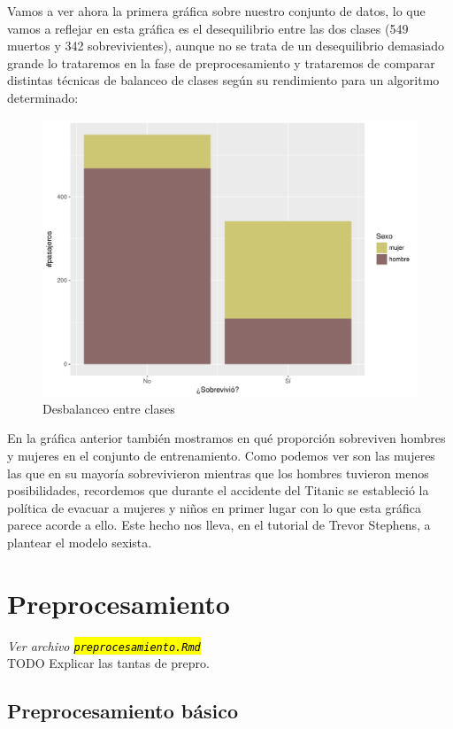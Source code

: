 \documentclass[10pt,a4paper]{article}
\newcommand{\archive}[1]{\sethlcolor{light-blue}\hl{\texttt{#1}}} %
\begin{document}
Vamos a ver ahora la primera gráfica sobre nuestro conjunto de datos, lo que vamos a reflejar en esta gráfica es el desequilibrio entre las dos clases (549 muertos y 342 sobrevivientes), aunque no se trata de un desequilibrio demasiado grande lo trataremos en la fase de preprocesamiento y trataremos de comparar distintas técnicas de balanceo de clases según su rendimiento para un algoritmo determinado:

\begin{figure}[H]
  \centering
  \includegraphics[width=\textwidth]{imgs/imbalanced.pdf}
  \caption{Desbalanceo entre clases}
\end{figure}

En la gráfica anterior también mostramos en qué proporción sobreviven hombres y mujeres en el conjunto de entrenamiento. Como podemos ver son las mujeres las que en su mayoría sobrevivieron mientras que los hombres tuvieron menos posibilidades, recordemos que durante el accidente del Titanic se estableció la política de evacuar a mujeres y niños en primer lugar con lo que esta gráfica parece acorde a ello. Este hecho nos lleva, en el tutorial de Trevor Stephens, a plantear el modelo sexista.

\section{Preprocesamiento} \emph{Ver archivo \archive{preprocesamiento.Rmd}}\\

TODO Explicar las tantas de prepro.

\subsection{Preprocesamiento básico}
\end{document}
